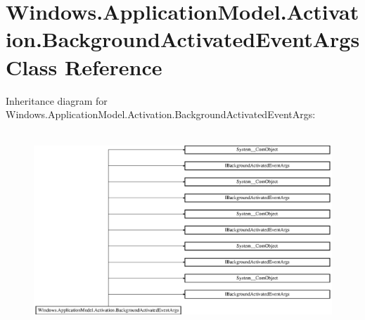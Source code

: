 \hypertarget{class_windows_1_1_application_model_1_1_activation_1_1_background_activated_event_args}{}\section{Windows.\+Application\+Model.\+Activation.\+Background\+Activated\+Event\+Args Class Reference}
\label{class_windows_1_1_application_model_1_1_activation_1_1_background_activated_event_args}
Inheritance diagram for Windows.\+Application\+Model.\+Activation.\+Background\+Activated\+Event\+Args\+:\begin{figure}[H]
\begin{center}
\leavevmode
\includegraphics[height=7.403846cm]{class_windows_1_1_application_model_1_1_activation_1_1_background_activated_event_args}
\end{center}
\end{figure}
